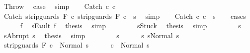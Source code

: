 \begin{isabellebody}
\ Throw\ \isamarkupfalse%
\ {\isacharquery}case\ \isamarkupfalse%
\ simp\isanewline
{}\isamarkupfalse%
\isanewline
\ \ \isamarkupfalse%
\ {\isacharparenleft}Catch\ c{}\ c{}{\isacharparenright}\isanewline
\ \ \isamarkupfalse%
\ {\isachardoublequoteopen}{\isasymGamma}{\isasymturnstile}Catch\ {\isacharparenleft}strip{\isacharunderscore}guards\ F\ c{}{\isacharparenright}\ {\isacharparenleft}strip{\isacharunderscore}guards\ F\ c{}{\isacharparenright}\ {\isasymdown}\ s{\isachardoublequoteclose}\ \isamarkupfalse%
\ simp\isanewline
\ \ \isamarkupfalse%
\ {\isachardoublequoteopen}{\isasymGamma}{\isasymturnstile}Catch\ c{}\ c{}\ {\isasymdown}\ s{\isachardoublequoteclose}\isanewline
\ \ \isamarkupfalse%
\ {\isacharparenleft}cases{\isacharparenright}\isanewline
\ \ \ \ \isamarkupfalse%
\ f\ \isamarkupfalse%
\ {\isachardoublequoteopen}s{\isacharequal}Fault\ f{\isachardoublequoteclose}\ \isamarkupfalse%
\ {\isacharquery}thesis\ \isamarkupfalse%
\ simp\isanewline
\ \ \isamarkupfalse%
\isanewline
\ \ \ \ \isamarkupfalse%
\ {\isachardoublequoteopen}s{\isacharequal}Stuck{\isachardoublequoteclose}\ \isamarkupfalse%
\ {\isacharquery}thesis\ \isamarkupfalse%
\ simp\isanewline
\ \ \isamarkupfalse%
\isanewline
\ \ \ \ \isamarkupfalse%
\ s{\isacharprime}\ \isamarkupfalse%
\ {\isachardoublequoteopen}s{\isacharequal}Abrupt\ s{\isacharprime}{\isachardoublequoteclose}\ \isamarkupfalse%
\ {\isacharquery}thesis\ \isamarkupfalse%
\ simp\isanewline
\ \ \isamarkupfalse%
\isanewline
\ \ \ \ \isamarkupfalse%
\ s{\isacharprime}\isanewline
\ \ \ \ \isamarkupfalse%
\ s{\isacharcolon}\ {\isachardoublequoteopen}s{\isacharequal}Normal\ s{\isacharprime}{\isachardoublequoteclose}\isanewline
\ \ \ \ \isamarkupfalse%
\ {\isachardoublequoteopen}{\isasymGamma}{\isasymturnstile}strip{\isacharunderscore}guards\ F\ c{}\ {\isasymdown}\ Normal\ s{\isacharprime}{\isachardoublequoteclose}\isanewline
\ \ \ \ \isamarkupfalse%
\ {\isachardoublequoteopen}{\isasymGamma}{\isasymturnstile}c{}\ {\isasymdown}\ Normal\ s{\isacharprime}{\isachardoublequoteclose}\ \isanewline
\ \ \ \ \ \ \isamarkupfalse%

\end{isabellebody}
